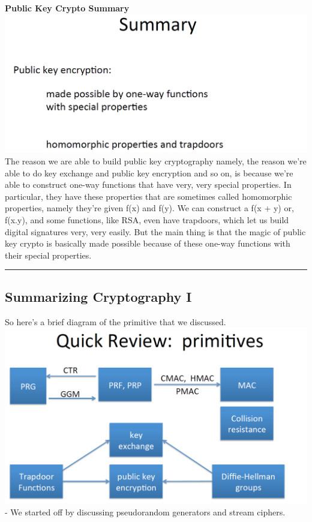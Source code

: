 \documentclass[11pt]{article}
\makeatletter
\def\maxwidth{\ifdim\Gin@nat@width>\linewidth\linewidth
    \else\Gin@nat@width\fi}
\let\Oldincludegraphics\includegraphics
\renewcommand{\includegraphics}[1]{\Oldincludegraphics[width=.8\maxwidth]{#1}}
\makeatother
\begin{document}
\textbf{Public Key Crypto Summary}
\includegraphics{./Images/PKCrypto-Summary.png} The reason we are able
to build public key cryptography namely, the reason we're able to do key
exchange and public key encryption and so on, is because we're able to
construct one-way functions that have very, very special properties. In
particular, they have these properties that are sometimes called
homomorphic properties, namely they're given f(x) and f(y). We can
construct a f(x + y) or, f(x.y), and some functions, like RSA, even have
trapdoors, which let us build digital signatures very, very easily. But
the main thing is that the magic of public key crypto is basically made
possible because of these one-way functions with their special
properties.

\begin{center}\rule{0.5\linewidth}{\linethickness}\end{center}

    \hypertarget{summarizing-cryptography-i}{%
\subsection{Summarizing Cryptography
I}\label{summarizing-cryptography-i}}

So here's a brief diagram of the primitive that we discussed.
\includegraphics{./Images/Review-Primitives1.png} - We started off by
discussing pseudorandom generators and stream ciphers.
\end{document}
